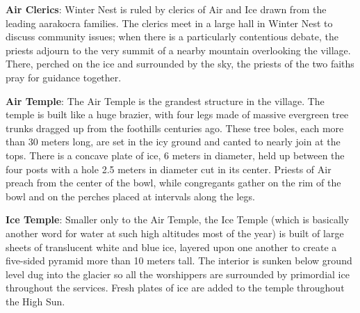 {
	\textbf{Air Clerics}: Winter Nest is ruled by clerics of Air and Ice drawn from the leading aarakocra families. The clerics meet in a large hall in Winter Nest to discuss community issues; when there is a particularly contentious debate, the priests adjourn to the very summit of a nearby mountain overlooking the village. There, perched on the ice and surrounded by the sky, the priests of the two faiths pray for guidance together.	
}
{}
{
	\textbf{Air Temple}: The Air Temple is the grandest structure in the village. The temple is built like a huge brazier, with four legs made of massive evergreen tree trunks dragged up from the foothills centuries ago. These tree boles, each more than 30 meters long, are set in the icy ground and canted to nearly join at the tops. There is a concave plate of ice, 6 meters in diameter, held up between the four posts with a hole 2.5 meters in diameter cut in its center. Priests of Air preach from the center of the bowl, while congregants gather on the rim of the bowl and on the perches placed at intervals along the legs.

	\textbf{Ice Temple}: Smaller only to the Air Temple, the Ice Temple (which is basically another word for water at such high altitudes most of the year) is built of large sheets of translucent white and blue ice, layered upon one another to create a five-sided pyramid more than 10 meters tall. The interior is sunken below ground level dug into the glacier so all the worshippers are surrounded by primordial ice throughout the services. Fresh plates of ice are added to the temple throughout the High Sun.
}
